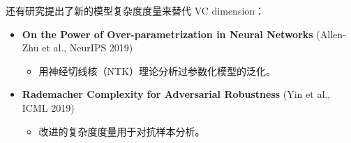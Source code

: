 \documentclass[lang=cn,newtx,10pt,scheme=chinese,chinesefont=nofont,citestyle=gb7714-2015, bibstyle=gb7714-2015]{elegantbook}
\begin{document}
\begin{refsection}
还有研究提出了新的模型复杂度度量来替代 VC dimension：

\begin{itemize}
    \item \textbf{On the Power of Over-parametrization in Neural Networks} (Allen-Zhu et al., NeurIPS 2019)
    \begin{itemize}
        \item 用神经切线核（NTK）理论分析过参数化模型的泛化。
    \end{itemize}
    
    \item \textbf{Rademacher Complexity for Adversarial Robustness} (Yin et al., ICML 2019)
    \begin{itemize}
        \item 改进的复杂度度量用于对抗样本分析。
    \end{itemize}
\end{itemize}

\printbibliography[heading=subbibliography, title={本章参考文献}]

\end{refsection}
\end{document}
